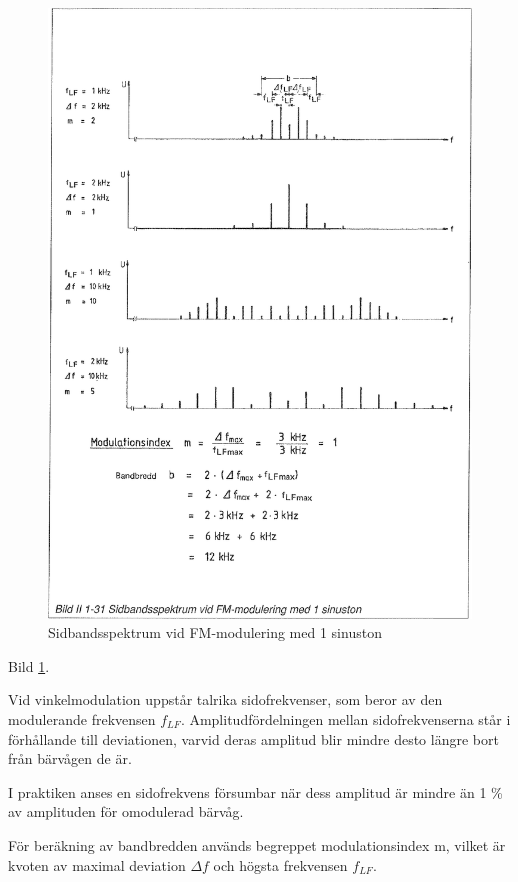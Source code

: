 \begin{figure}
\includegraphics[width=\textwidth]{images/bild_2_1-31}
\caption{Sidbandsspektrum vid FM-modulering med 1 sinuston}
\label{fig:BildII1-31}
\end{figure}

Bild \ref{fig:BildII1-31}.

Vid vinkelmodulation uppstår talrika sidofrekvenser, som beror av den
modulerande frekvensen \(f_{LF}\). Amplitudfördelningen mellan sidofrekvenserna
står i förhållande till deviationen, varvid deras amplitud blir mindre desto
längre bort från bärvågen de är.

I praktiken anses en sidofrekvens försumbar när dess amplitud är mindre än 1 \%
av amplituden för omodulerad bärvåg.

För beräkning av bandbredden används begreppet modulationsindex m, vilket är
kvoten av maximal deviation \(\Delta f\) och högsta frekvensen \(f_{LF}\).

